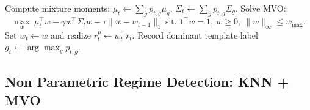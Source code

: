 \documentclass[11pt]{article}
\begin{document}
\begin{algorithm}[H]
\begin{algorithmic}[1]
    \State Compute mixture moments: $\mu_t\leftarrow\sum_g p_{t,g}\mu_g$, $\Sigma_t\leftarrow\sum_g p_{t,g}\Sigma_g$.
    \State Solve MVO:
    \[
    \max_{w}\ \mu_t^\top w-\gamma w^\top\Sigma_t w-\tau\|w-w_{t-1}\|_1
    \ \text{s.t.}\ \mathbf{1}^\top w=1,\ w\ge0,\ \|w\|_\infty\le w_{\max}.
    \]
    \State Set $w_t\leftarrow w$ and realize $r_t^p\leftarrow w_t^\top r_t$.
    \State Record dominant template label $g_t\leftarrow \arg\max_g p_{t,g}$.
\EndFor

\end{algorithmic}
\end{algorithm}

\subsection{Non Parametric Regime Detection: KNN + MVO }
\label{subsec:knn_mvo_pseudocode}
\end{document}
